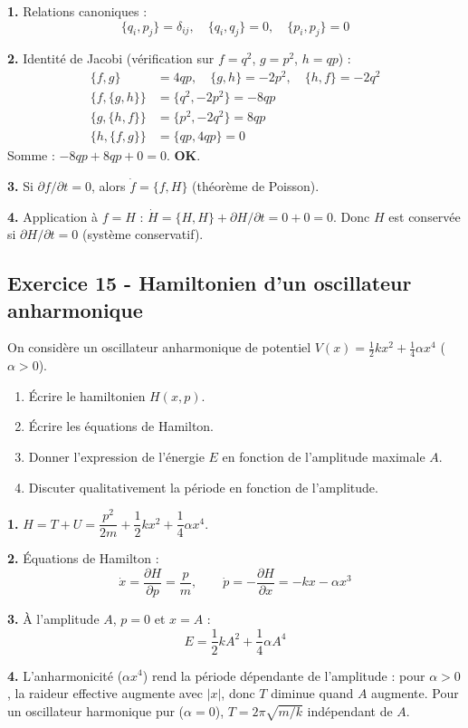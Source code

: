 \documentclass[12pt,a4paper]{article}
\begin{document}
\begin{boitecorrige}
\textbf{1.} Relations canoniques :
\[
\{q_i, p_j\} = \delta_{ij}, \quad \{q_i, q_j\} = 0, \quad \{p_i, p_j\} = 0
\]

\textbf{2.} Identité de Jacobi (vérification sur $f = q^2$, $g = p^2$, $h = qp$) :
\begin{align*}
\{f, g\} &= 4qp, \quad \{g, h\} = -2p^2, \quad \{h, f\} = -2q^2 \\
\{f, \{g, h\}\} &= \{q^2, -2p^2\} = -8qp \\
\{g, \{h, f\}\} &= \{p^2, -2q^2\} = 8qp \\
\{h, \{f, g\}\} &= \{qp, 4qp\} = 0
\end{align*}
Somme : $-8qp + 8qp + 0 = 0$. \textbf{OK}.

\textbf{3.} Si $\partial f/\partial t = 0$, alors $\dot f = \{f, H\}$ (théorème de Poisson).

\textbf{4.} Application à $f = H$ : $\dot H = \{H, H\} + \partial H/\partial t = 0 + 0 = 0$. Donc $H$ est conservée si $\partial H/\partial t = 0$ (système conservatif).
\end{boitecorrige}

\subsection*{Exercice 15 - Hamiltonien d'un oscillateur anharmonique \niveau{\difficile}}

\begin{boiteexercice}
On considère un oscillateur anharmonique de potentiel $V(x) = \tfrac{1}{2}kx^2 + \tfrac{1}{4}\alpha x^4$ ($\alpha > 0$).
\begin{enumerate}
  \item Écrire le hamiltonien $H(x, p)$.
  \item Écrire les équations de Hamilton.
  \item Donner l'expression de l'énergie $E$ en fonction de l'amplitude maximale $A$.
  \item Discuter qualitativement la période en fonction de l'amplitude.
\end{enumerate}
\end{boiteexercice}

\begin{boitecorrige}
\textbf{1.} $H = T + U = \dfrac{p^2}{2m} + \dfrac{1}{2}kx^2 + \dfrac{1}{4}\alpha x^4$.

\textbf{2.} Équations de Hamilton :
\[
\dot x = \frac{\partial H}{\partial p} = \frac{p}{m}, \qquad \dot p = -\frac{\partial H}{\partial x} = -kx - \alpha x^3
\]

\textbf{3.} À l'amplitude $A$, $p = 0$ et $x = A$ :
\[
E = \frac{1}{2}kA^2 + \frac{1}{4}\alpha A^4
\]

\textbf{4.} L'anharmonicité ($\alpha x^4$) rend la période dépendante de l'amplitude : pour $\alpha > 0$, la raideur effective augmente avec $|x|$, donc $T$ diminue quand $A$ augmente. Pour un oscillateur harmonique pur ($\alpha = 0$), $T = 2\pi\sqrt{m/k}$ indépendant de $A$.
\end{boitecorrige}
\end{document}
